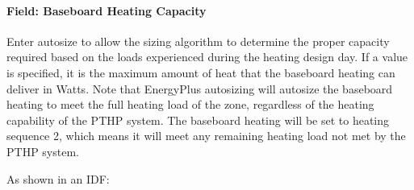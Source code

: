 \paragraph{Field: Baseboard Heating Capacity}\label{field-baseboard-heating-capacity-5}

Enter autosize to allow the sizing algorithm to determine the proper capacity required based on the loads experienced during the heating design day. If a value is specified, it is the maximum amount of heat that the baseboard heating can deliver in Watts. Note that EnergyPlus autosizing will autosize the baseboard heating to meet the full heating load of the zone, regardless of the heating capability of the PTHP system. The baseboard heating will be set to heating sequence 2, which means it will meet any remaining heating load not met by the PTHP system.

As shown in an IDF:

